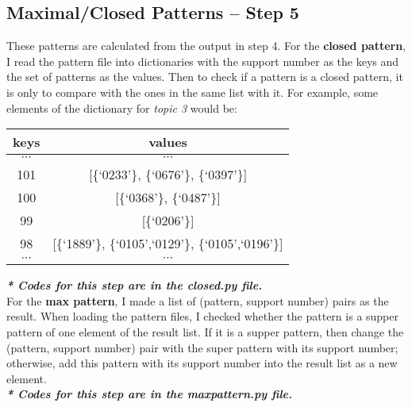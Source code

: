 \documentclass[11pt]{article}
\begin{document}
\subsection{Maximal/Closed Patterns -- Step 5}

These patterns are calculated from the output in step 4. For the {\bf closed pattern}, I read the pattern file into dictionaries with the support number as the keys and the set of patterns as the values. Then to check if a pattern is a closed pattern, it is only to compare with the ones in the same list with it. For example, some elements of the dictionary for {\it topic 3} would be:

\begin{center}
\begin{tabular}{c|c}
keys & values\\
\hline 
$\cdots$ & $\cdots$ \\
101 & [\{`0233'\}, \{`0676'\}, \{`0397'\}]\\
100 & [\{`0368'\}, \{`0487'\}]\\
99 & [\{`0206'\}]\\
98 & [\{`1889'\}, \{`0105',`0129'\}, \{`0105',`0196'\}]\\
$\cdots$ & $\cdots$ \\
\end{tabular}
\end{center}
\textit{\textbf{* Codes for this step are in the closed.py file.}}\\

For the {\bf max pattern}, I made a list of (pattern, support number) pairs as the result. When loading the pattern files, I checked whether the pattern is a supper pattern of one element of the result list. If it is a supper pattern, then change the (pattern, support number) pair with the super pattern with its support number; otherwise, add this pattern with its support number into the result list as a new element.\\
\textit{\textbf{* Codes for this step are in the maxpattern.py file.}}
\end{document}
